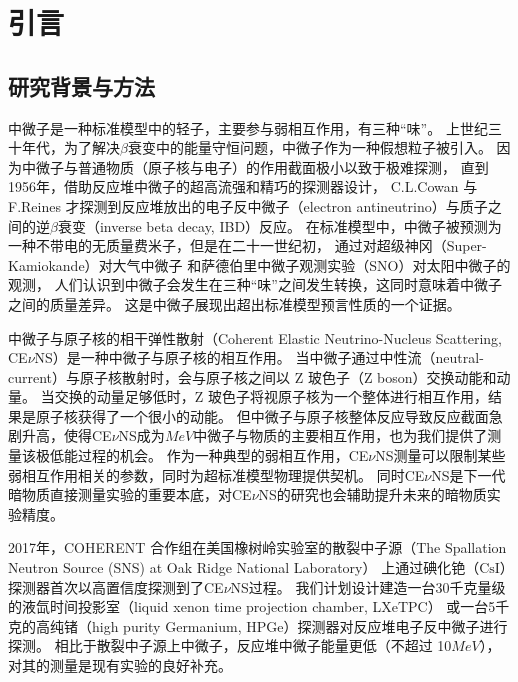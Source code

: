 
\chapter{引言}

\section{研究背景与方法}

中微子是一种标准模型中的轻子，主要参与弱相互作用，有三种``味''。
上世纪三十年代，为了解决$\beta$衰变中的能量守恒问题，中微子作为一种假想粒子被引入。
因为中微子与普通物质（原子核与电子）的作用截面极小以致于极难探测，
直到1956年，借助反应堆中微子的超高流强和精巧的探测器设计，
C.L.Cowan 与 F.Reines 才探测到反应堆放出的电子反中微子（electron antineutrino）与质子之间的逆$\beta$衰变（inverse beta decay, IBD）反应\cite{cowan_detection_1956}。
在标准模型中，中微子被预测为一种不带电的无质量费米子，但是在二十一世纪初，
通过对超级神冈（Super-Kamiokande）\cite{collaboration_evidence_1998}对大气中微子
和萨德伯里中微子观测实验（SNO）\cite{sno_collaboration_direct_2002}对太阳中微子的观测，
人们认识到中微子会发生在三种``味''之间发生转换，这同时意味着中微子之间的质量差异。
这是中微子展现出超出标准模型预言性质的一个证据。

中微子与原子核的相干弹性散射（Coherent Elastic Neutrino-Nucleus Scattering, CE$\nu$NS）是一种中微子与原子核的相互作用。
当中微子通过中性流（neutral-current）与原子核散射时，会与原子核之间以 Z 玻色子（Z boson）交换动能和动量。
当交换的动量足够低时，Z 玻色子将视原子核为一个整体进行相互作用，结果是原子核获得了一个很小的动能。
但中微子与原子核整体反应导致反应截面急剧升高，使得CE$\nu$NS成为$\si{MeV}$中微子与物质的主要相互作用，也为我们提供了测量该极低能过程的机会。
作为一种典型的弱相互作用，CE$\nu$NS测量可以限制某些弱相互作用相关的参数，同时为超标准模型物理提供契机。
同时CE$\nu$NS是下一代暗物质直接测量实验的重要本底\cite{ohare_fog_2021}，对CE$\nu$NS的研究也会辅助提升未来的暗物质实验精度。

2017年，COHERENT 合作组在美国橡树岭实验室的散裂中子源（The Spallation Neutron Source (SNS) at Oak Ridge National Laboratory）
上通过碘化铯（$\mathrm{CsI}$）探测器首次以高置信度探测到了CE$\nu$NS过程。
我们计划设计建造一台30千克量级的液氙时间投影室（liquid xenon time projection chamber, LXeTPC）
或一台5千克的高纯锗（high purity Germanium, HPGe）探测器对反应堆电子反中微子进行探测。
相比于散裂中子源上中微子，反应堆中微子能量更低（不超过 10$\si{MeV}$），对其的测量是现有实验的良好补充。


